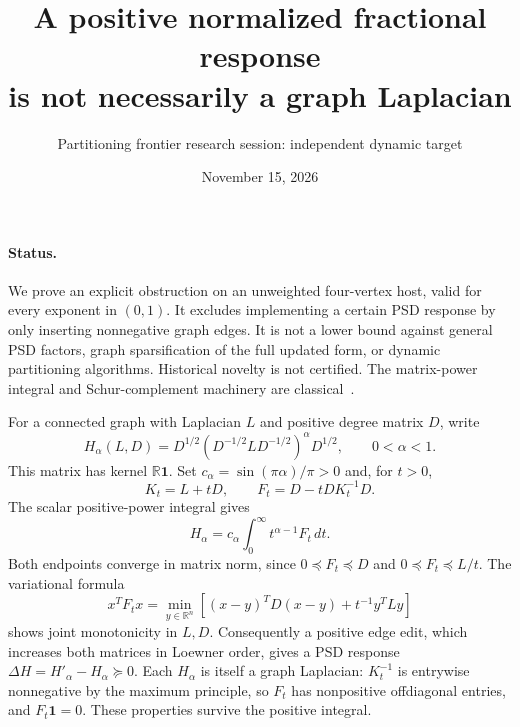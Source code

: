 \documentclass[11pt]{article}
\title{A positive normalized fractional response\protect\\is not necessarily a graph Laplacian}
\author{Partitioning frontier research session: independent dynamic target}
\date{November 15, 2026}
\newcommand{\R}{\mathbb R}
\begin{document}
\maketitle

\paragraph{Status.}
We prove an explicit obstruction on an unweighted four-vertex host,
valid for every exponent in $(0,1)$. It excludes implementing a certain
PSD response by only inserting nonnegative graph edges. It is not a
lower bound against general PSD factors, graph sparsification of the full
updated form, or dynamic partitioning algorithms. Historical novelty is
not certified. The matrix-power integral and Schur-complement machinery
are classical~\cite{KA,DB}.

For a connected graph with Laplacian $L$ and positive degree matrix $D$,
write
\[
 H_\alpha(L,D)=D^{1/2}(D^{-1/2}LD^{-1/2})^\alpha D^{1/2},
 \qquad 0<\alpha<1.
\]
This matrix has kernel $\R\mathbf1$. Set
$c_\alpha=\sin(\pi\alpha)/\pi>0$ and, for $t>0$,
\[
 K_t=L+tD,\qquad F_t=D-tD K_t^{-1}D.
\]
The scalar positive-power integral gives
\begin{equation}\label{eq:int}
 H_\alpha=c_\alpha\int_0^\infty t^{\alpha-1}F_t\,dt.
\end{equation}
Both endpoints converge in matrix norm, since
$0\preceq F_t\preceq D$ and $0\preceq F_t\preceq L/t$.
The variational formula
\[
 x^TF_tx=\min_{y\in\R^n}
 \left[(x-y)^TD(x-y)+t^{-1}y^TLy\right]
\]
shows joint monotonicity in $L,D$. Consequently a positive edge edit,
which increases both matrices in Loewner order, gives a PSD response
$\Delta H=H'_\alpha-H_\alpha\succeq0$.
Each $H_\alpha$ is itself a graph Laplacian: $K_t^{-1}$ is entrywise
nonnegative by the maximum principle, so $F_t$ has nonpositive
offdiagonal entries, and $F_t\mathbf1=0$. These properties survive
the positive integral.
\end{document}
